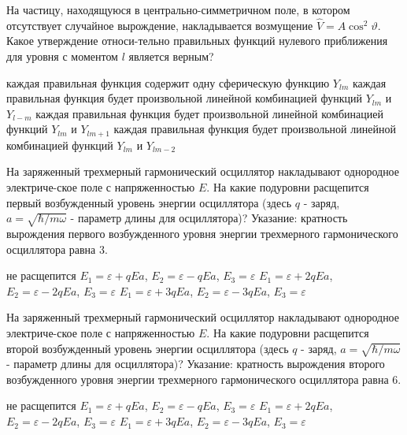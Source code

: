 \documentclass[11pt,a4paper]{exam}
\begin{document}
\begin{questions}
\question На частицу, находящуюся в центрально-симметричном поле, в котором отсутствует случайное вырождение, накладывается возмущение $\hat V = A{\cos ^2}\vartheta $. Какое утверждение относи-тельно правильных функций нулевого приближения для уровня с моментом $l$ является верным?
\begin{choices}
\choice каждая правильная функция содержит одну сферическую функцию ${Y_{lm}}$
\choice каждая правильная функция будет произвольной линейной комбинацией функций ${Y_{lm}}$ и ${Y_{l - m}}$
\choice каждая правильная функция будет произвольной линейной комбинацией функций ${Y_{lm}}$ и ${Y_{lm + 1}}$
\choice каждая правильная функция будет произвольной линейной комбинацией функций ${Y_{lm}}$ и ${Y_{lm - 2}}$
 
\end{choices}

\question На заряженный трехмерный гармонический осциллятор накладывают однородное электриче-ское поле с напряженностью $E$. На какие подуровни расщепится первый возбужденный уровень энергии осциллятора (здесь $q$ - заряд, $a = \sqrt {\hbar /m\omega } $ - параметр длины для осциллятора)? Указание: кратность вырождения первого возбужденного уровня энергии трехмерного гармонического осциллятора равна 3.
\begin{choices}
\choice не расщепится           
\choice ${E_1} = \varepsilon  + qEa$, ${E_2} = \varepsilon  - qEa$, ${E_3} = \varepsilon $
\choice ${E_1} = \varepsilon  + 2qEa$,  ${E_2} = \varepsilon  - 2qEa$, ${E_3} = \varepsilon $  
\choice ${E_1} = \varepsilon  + 3qEa$, ${E_2} = \varepsilon  - 3qEa$, ${E_3} = \varepsilon $
\end{choices}

\question На заряженный трехмерный гармонический осциллятор накладывают однородное электриче-ское поле с напряженностью $E$. На какие подуровни расщепится второй возбужденный уровень энергии осциллятора (здесь $q$ - заряд, $a = \sqrt {\hbar /m\omega } $ - параметр длины для осциллятора)? Указание: кратность вырождения второго возбужденного уровня энергии трехмерного гармонического осциллятора равна 6.
\begin{choices}
\choice не расщепится           
\choice ${E_1} = \varepsilon  + qEa$, ${E_2} = \varepsilon  - qEa$, ${E_3} = \varepsilon $
\choice ${E_1} = \varepsilon  + 2qEa$,  ${E_2} = \varepsilon  - 2qEa$, ${E_3} = \varepsilon $  
\choice ${E_1} = \varepsilon  + 3qEa$, ${E_2} = \varepsilon  - 3qEa$, ${E_3} = \varepsilon $
\end{choices}


\end{questions}
\end{document}
